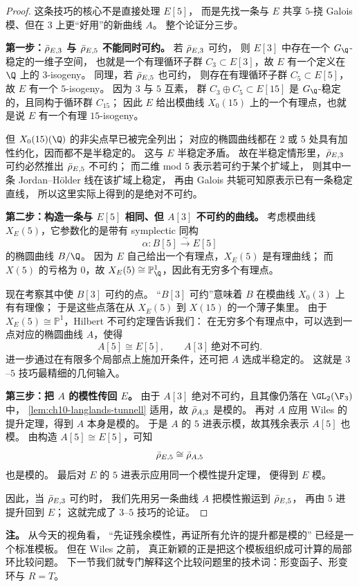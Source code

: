 \begin{proof}
这条技巧的核心不是直接处理 $E[5]$，
而是先找一条与 $E$ 共享 $5$-挠 Galois 模、但在 $3$ 上更“好用”的新曲线 $A$。
整个论证分三步。

\textbf{第一步：$\bar{\rho}_{E,3}$ 与 $\bar{\rho}_{E,5}$ 不能同时可约。}
若 $\bar{\rho}_{E,3}$ 可约，
则 $E[3]$ 中存在一个 $G_\Q$-稳定的一维子空间，
也就是一个有理循环子群 $C_3\subset E[3]$，故 $E$ 有一个定义在 $\Q$ 上的 $3$-isogeny。
同理，若 $\bar{\rho}_{E,5}$ 也可约，
则存在有理循环子群 $C_5\subset E[5]$，故 $E$ 有一个 $5$-isogeny。
因为 $3$ 与 $5$ 互素，
群 $C_3\oplus C_5\subset E[15]$ 是 $G_\Q$-稳定的，且同构于循环群 $C_{15}$；
因此 $E$ 给出模曲线 $X_0(15)$ 上的一个有理点，也就是说 $E$ 有一个有理 $15$-isogeny。

但 $X_0(15)(\Q)$ 的非尖点早已被完全列出；
对应的椭圆曲线都在 $2$ 或 $5$ 处具有加性约化，因而都不是半稳定的。
这与 $E$ 半稳定矛盾。
故在半稳定情形里，$\bar{\rho}_{E,3}$ 可约必然推出 $\bar{\rho}_{E,5}$ 不可约；
而二维 mod $5$ 表示若可约于某个扩域上，
则其中一条 Jordan--H\"older 线在该扩域上稳定，
再由 Galois 共轭可知原表示已有一条稳定直线，
所以这里实际上得到的是绝对不可约。

\textbf{第二步：构造一条与 $E[5]$ 相同、但 $A[3]$ 不可约的曲线。}
考虑模曲线 $X_E(5)$，它参数化的是带有 symplectic 同构
\[
  \alpha\colon B[5]\xrightarrow{\sim} E[5]
\]
的椭圆曲线 $B/\Q$。
因为 $E$ 自己给出一个有理点，$X_E(5)$ 是有理曲线；
而 $X(5)$ 的亏格为 $0$，故 $X_E(5)\cong \mathbb P^1_\Q$，因此有无穷多个有理点。

现在考察其中使 $B[3]$ 可约的点。
“$B[3]$ 可约”意味着 $B$ 在模曲线 $X_0(3)$ 上有有理像；
 于是这些点落在从 $X_E(5)$ 到 $X(15)$ 的一个薄子集里。
由于 $X_E(5)\cong \mathbb P^1$，Hilbert 不可约定理告诉我们：
在无穷多个有理点中，可以选到一点对应的椭圆曲线 $A$，使得
\[
  A[5]\cong E[5],
  \qquad
  A[3]\ \text{绝对不可约}.
\]
进一步通过在有限多个局部点上施加开条件，还可把 $A$ 选成半稳定的。
这就是 $3$--$5$ 技巧最精细的几何输入。

\textbf{第三步：把 $A$ 的模性传回 $E$。}
由于 $A[3]$ 绝对不可约，且其像仍落在 $\GL_2(\F_3)$ 中，
\cref{lem:ch10-langlands-tunnell} 适用，故 $\bar{\rho}_{A,3}$ 是模的。
再对 $A$ 应用 Wiles 的提升定理，得到 $A$ 本身是模的。
于是 $A$ 的 $5$ 进表示模，故其残余表示 $A[5]$ 也模。
由构造 $A[5]\cong E[5]$，可知
\[
  \bar{\rho}_{E,5}\cong \bar{\rho}_{A,5}
\]
也是模的。
最后对 $E$ 的 $5$ 进表示应用同一个模性提升定理，
便得到 $E$ 模。

因此，当 $\bar{\rho}_{E,3}$ 可约时，
我们先用另一条曲线 $A$ 把模性搬运到 $\bar{\rho}_{E,5}$，
再由 $5$ 进提升回到 $E$；
这就完成了 $3$--$5$ 技巧的论证。
\end{proof}

\textbf{注。}
从今天的视角看，
“先证残余模性，再证所有允许的提升都是模的”
已经是一个标准模板。
但在 Wiles 之前，
真正新颖的正是把这个模板组织成可计算的局部环比较问题。
下一节我们就专门解释这个比较问题里的技术词：形变函子、形变环与 $R=T$。
